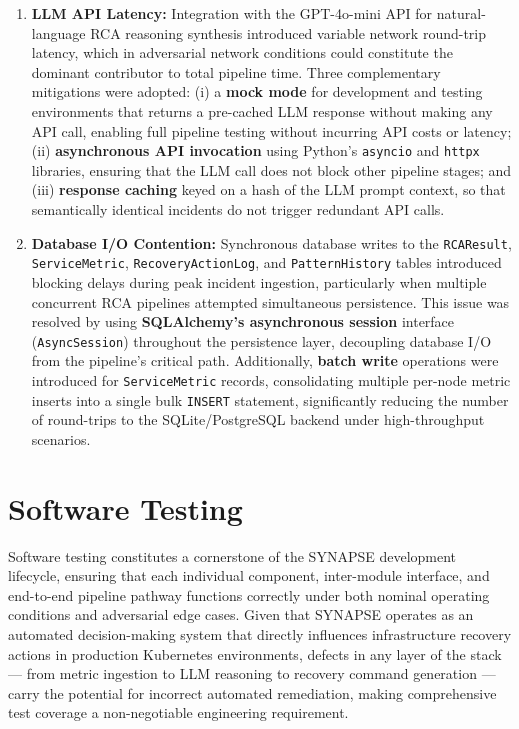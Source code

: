 \begin{enumerate}[label=\textbf{\Alph*.},leftmargin=1.2cm]
    \item \textbf{LLM API Latency:} Integration with the GPT-4o-mini API for natural-language RCA reasoning synthesis introduced variable network round-trip latency, which in adversarial network conditions could constitute the dominant contributor to total pipeline time. Three complementary mitigations were adopted: (i) a \textbf{mock mode} for development and testing environments that returns a pre-cached LLM response without making any API call, enabling full pipeline testing without incurring API costs or latency; (ii) \textbf{asynchronous API invocation} using Python's \texttt{asyncio} and \texttt{httpx} libraries, ensuring that the LLM call does not block other pipeline stages; and (iii) \textbf{response caching} keyed on a hash of the LLM prompt context, so that semantically identical incidents do not trigger redundant API calls.

    \item \textbf{Database I/O Contention:} Synchronous database writes to the \texttt{RCAResult}, \texttt{ServiceMetric}, \texttt{RecoveryActionLog}, and \texttt{PatternHistory} tables introduced blocking delays during peak incident ingestion, particularly when multiple concurrent RCA pipelines attempted simultaneous persistence. This issue was resolved by using \textbf{SQLAlchemy's asynchronous session} interface (\texttt{AsyncSession}) throughout the persistence layer, decoupling database I/O from the pipeline's critical path. Additionally, \textbf{batch write} operations were introduced for \texttt{ServiceMetric} records, consolidating multiple per-node metric inserts into a single bulk \texttt{INSERT} statement, significantly reducing the number of round-trips to the SQLite/PostgreSQL backend under high-throughput scenarios.

\end{enumerate}

\section{Software Testing}

\hspace*{0.3in} Software testing constitutes a cornerstone of the SYNAPSE development lifecycle, ensuring that each individual component, inter-module interface, and end-to-end pipeline pathway functions correctly under both nominal operating conditions and adversarial edge cases. Given that SYNAPSE operates as an automated decision-making system that directly influences infrastructure recovery actions in production Kubernetes environments, defects in any layer of the stack — from metric ingestion to LLM reasoning to recovery command generation — carry the potential for incorrect automated remediation, making comprehensive test coverage a non-negotiable engineering requirement.\\\\


